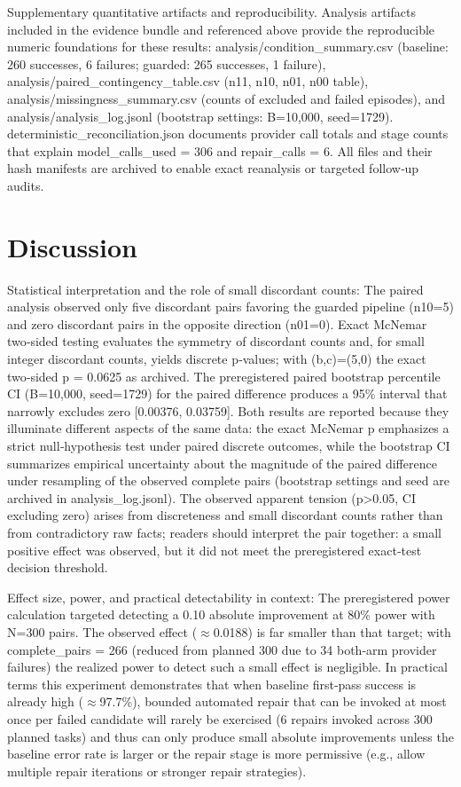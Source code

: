 \documentclass[conference]{IEEEtran}
\begin{document}
Supplementary quantitative artifacts and reproducibility. Analysis artifacts included in the evidence bundle and referenced above provide the reproducible numeric foundations for these results: analysis/condition\_summary.csv (baseline: 260 successes, 6 failures; guarded: 265 successes, 1 failure), analysis/paired\_contingency\_table.csv (n11, n10, n01, n00 table), analysis/missingness\_summary.csv (counts of excluded and failed episodes), and analysis/analysis\_log.jsonl (bootstrap settings: B=10,000, seed=1729). deterministic\_reconciliation.json documents provider call totals and stage counts that explain model\_calls\_used = 306 and repair\_calls = 6. All files and their hash manifests are archived to enable exact reanalysis or targeted follow‑up audits.

\section{Discussion}
Statistical interpretation and the role of small discordant counts: The paired analysis observed only five discordant pairs favoring the guarded pipeline (n10=5) and zero discordant pairs in the opposite direction (n01=0). Exact McNemar two‑sided testing evaluates the symmetry of discordant counts and, for small integer discordant counts, yields discrete p‑values; with (b,c)=(5,0) the exact two‑sided p = 0.0625 as archived. The preregistered paired bootstrap percentile CI (B=10,000, seed=1729) for the paired difference produces a 95\% interval that narrowly excludes zero [0.00376, 0.03759]. Both results are reported because they illuminate different aspects of the same data: the exact McNemar p emphasizes a strict null‑hypothesis test under paired discrete outcomes, while the bootstrap CI summarizes empirical uncertainty about the magnitude of the paired difference under resampling of the observed complete pairs (bootstrap settings and seed are archived in analysis\_log.jsonl). The observed apparent tension (p>0.05, CI excluding zero) arises from discreteness and small discordant counts rather than from contradictory raw facts; readers should interpret the pair together: a small positive effect was observed, but it did not meet the preregistered exact‑test decision threshold.

Effect size, power, and practical detectability in context: The preregistered power calculation targeted detecting a 0.10 absolute improvement at 80\% power with N=300 pairs. The observed effect (\ensuremath{\approx}0.0188) is far smaller than that target; with complete\_pairs = 266 (reduced from planned 300 due to 34 both‑arm provider failures) the realized power to detect such a small effect is negligible. In practical terms this experiment demonstrates that when baseline first‑pass success is already high (\ensuremath{\approx}97.7\%), bounded automated repair that can be invoked at most once per failed candidate will rarely be exercised (6 repairs invoked across 300 planned tasks) and thus can only produce small absolute improvements unless the baseline error rate is larger or the repair stage is more permissive (e.g., allow multiple repair iterations or stronger repair strategies).
\end{document}
